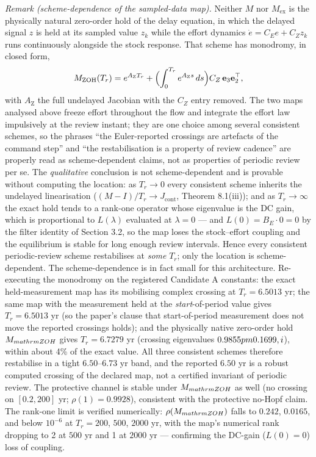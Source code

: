 \documentclass[11pt]{article}
\begin{document}
\emph{Remark (scheme-dependence of the sampled-data map).} Neither \(M\)
nor \(M_{\mathrm{ex}}\) is the physically natural zero-order hold of the
delay equation, in which the delayed signal \(z\) is held at its sampled
value \(z_k\) while the effort dynamics \(\dot e = C_E e + C_Z z_k\)
runs continuously alongside the stock response. That scheme has
monodromy, in closed form,
\[M_{\mathrm{ZOH}}(T_r) = e^{A_{\mathrm{Z}} T_r} + \Bigl( \int_0^{T_r} e^{A_{\mathrm{Z}} s}\, ds \Bigr) C_Z\, \mathbf e_3 \mathbf e_2^\top,\]
with \(A_{\mathrm{Z}}\) the full undelayed Jacobian with the \(C_Z\)
entry removed. The two maps analysed above freeze effort throughout the
flow and integrate the effort law impulsively at the review instant;
they are one choice among several consistent schemes, so the phrases
``the Euler-reported crossings are artefacts of the command step'' and
``the restabilisation is a property of review cadence'' are properly
read as scheme-dependent claims, not as properties of periodic review
per se. The \emph{qualitative} conclusion is not scheme-dependent and is
provable without computing the location: as \(T_r \to 0\) every
consistent scheme inherits the undelayed linearisation
(\((M - I)/T_r \to J_{\mathrm{cont}}\), Theorem 8.1(iii)); and as
\(T_r \to \infty\) the exact hold tends to a rank-one operator whose
eigenvalue is the DC gain, which is proportional to \(L(\lambda)\)
evaluated at \(\lambda = 0\) --- and \(L(0) = B_E \cdot 0 = 0\) by the
filter identity of Section 3.2, so the map loses the stock--effort
coupling and the equilibrium is stable for long enough review intervals.
Hence every consistent periodic-review scheme restabilises at
\emph{some} \(T_r\); only the location is scheme-dependent. The
scheme-dependence is in fact small for this architecture. Re-executing
the monodromy on the registered Candidate A constants: the exact
held-measurement map has its mobilising complex crossing at
\(T_r = 6.5013\) yr; the same map with the measurement held at the
\emph{start}-of-period value gives \(T_r = 6.5013\) yr (so the paper's
clause that start-of-period measurement does not move the reported
crossings holds); and the physically native zero-order hold
\(M_{\\mathrm{ZOH}}\) gives \(T_r = 6.7279\) yr (crossing eigenvalues
\(0.9855 \\pm 0.1699\\,i\)), within about 4\% of the exact value. All
three consistent schemes therefore restabilise in a tight
\(6.50\)--\(6.73\) yr band, and the reported \(6.50\) yr is a robust
computed crossing of the declared map, not a certified invariant of
periodic review. The protective channel is stable under
\(M_{\\mathrm{ZOH}}\) as well (no crossing on \([0.2, 200]\) yr;
\(\rho(1) = 0.9928\)), consistent with the protective no-Hopf claim. The
rank-one limit is verified numerically: \(\rho(M_{\\mathrm{ZOH}})\)
falls to \(0.242\), \(0.0165\), and below \(10^{-6}\) at \(T_r = 200\),
\(500\), \(2000\) yr, with the map's numerical rank dropping to 2 at
\(500\) yr and 1 at \(2000\) yr --- confirming the DC-gain
(\(L(0) = 0\)) loss of coupling.
\end{document}
